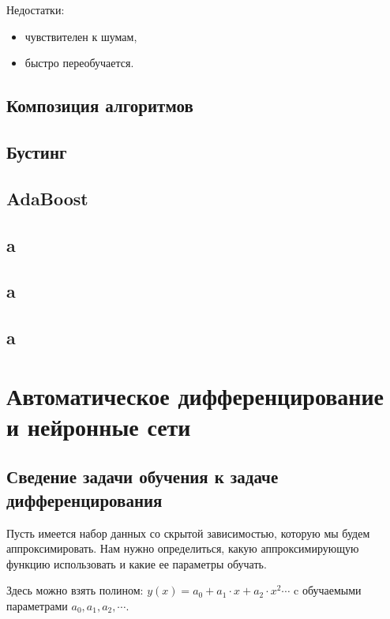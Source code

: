 Недостатки:
\begin{itemize}
    \item чувствителен к шумам,

    \item быстро переобучается.
\end{itemize}


\subsection{Композиция алгоритмов}

\subsection{Бустинг}

\subsection{AdaBoost}

\subsection{a}

\subsection{a}

\subsection{a}

\section{Автоматическое дифференцирование и нейронные сети}

\subsection{Сведение задачи обучения к задаче дифференцирования}

Пусть имеется набор данных со скрытой зависимостью, которую мы будем
аппроксимировать. Нам нужно определиться, какую аппроксимирующую функцию
использовать и какие ее параметры обучать.


Здесь можно взять полином: $y(x) = a_0 + a_1 \cdot x + a_2 \cdot x^2 \cdots$ c
обучаемыми параметрами $a_0, a_1, a_2, \cdots$.

